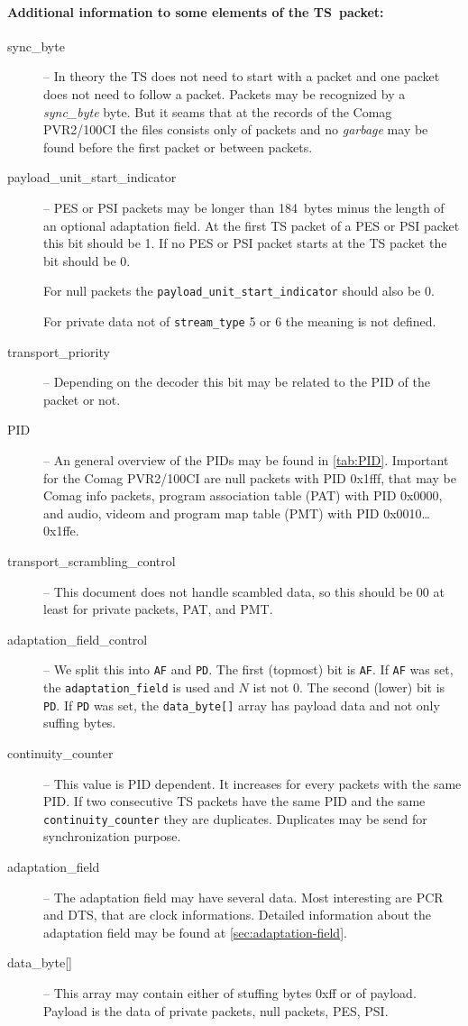 \documentclass{scrartcl}
\newcommand*{\Comag}{Comag PVR2/100CI\xspace}
\begin{document}
\paragraph{Additional information to some elements of the TS~packet:}
\begin{description}
\item[sync\_byte] -- In theory the TS does not need to start with a packet and
  one packet does not need to follow a packet. Packets may be recognized by a
  \emph{sync\_byte} byte. But it seams that at the records of the \Comag the
  files consists only of packets and no \emph{garbage} may be found before the
  first packet or between packets.
\item[payload\_unit\_start\_indicator] -- PES or PSI packets may be longer
  than 184~bytes minus the length of an optional adaptation field. At the
  first TS packet of a PES or PSI packet this bit should be 1. If no PES or
  PSI packet starts at the TS packet the bit should be 0.

  For null packets the \texttt{payload\_unit\_start\_indicator} should also be
  0.

  For private data not of \texttt{stream\_type} 5 or 6 the meaning is not
  defined.
\item[transport\_priority] -- Depending on the decoder this bit may be related
  to the PID of the packet or not.
\item[PID] -- An general overview of the PIDs may be found in
  \autoref{tab:PID}. Important for the \Comag are null packets with PID
  0x1fff, that may be Comag info packets, program association table (PAT) with
  PID 0x0000, and audio, videom and program map table (PMT) with PID
  0x0010\dots 0x1ffe.
\item[transport\_scrambling\_control] -- This document does not handle
  scambled data, so this should be 00 at least for private packets, PAT, and
  PMT.
\item[adaptation\_field\_control] -- We split this into \texttt{AF} and
  \texttt{PD}. The first (topmost) bit is \texttt{AF}. If \texttt{AF} was set,
  the \texttt{adaptation\_field} is used and $N$ ist not 0. The second (lower)
  bit is \texttt{PD}. If \texttt{PD} was set, the \texttt{data\_byte[]} array
  has payload data and not only suffing bytes.
\item[continuity\_counter] -- This value is PID dependent. It increases for
  every packets with the same PID. If two consecutive TS packets have the same
  PID and the same \texttt{continuity\_counter} they are
  duplicates. Duplicates may be send for synchronization purpose.
\item[adaptation\_field] -- The adaptation field may have several data. Most
  interesting are PCR and DTS, that are clock informations. Detailed
  information about the adaptation field may be found at
  \autoref{sec:adaptation-field}.
\item[{data\_byte[]}] -- This array may contain either of stuffing bytes 0xff or
  of payload. Payload is the data of private packets, null packets, PES, PSI.
\end{description}
\end{document}
